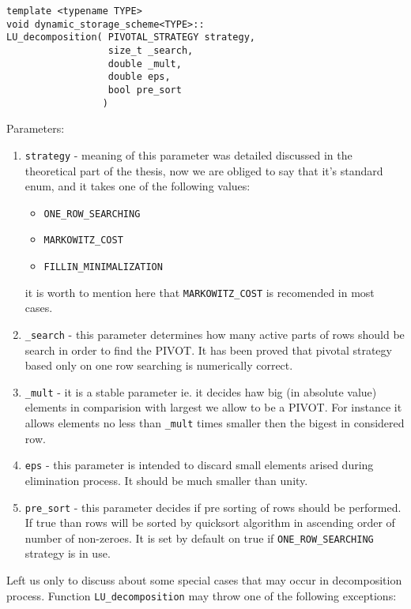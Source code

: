 \begin{verbatim}
template <typename TYPE>
void dynamic_storage_scheme<TYPE>::
LU_decomposition( PIVOTAL_STRATEGY strategy,
                  size_t _search,
                  double _mult,
                  double eps,
                  bool pre_sort
                 )
\end{verbatim}
Parameters:
\begin{enumerate}
	\item \texttt{strategy} - meaning of this parameter was detailed discussed in the theoretical part of the thesis, now we are obliged to say that it's standard enum, and it takes one of the following values:
	\begin{itemize}
		\item \texttt{ONE\_ROW\_SEARCHING}
		\item \texttt{MARKOWITZ\_COST}
    \item \texttt{FILLIN\_MINIMALIZATION}
	\end{itemize}
	it is worth to mention here that \texttt{MARKOWITZ\_COST} is recomended in most cases.
	
	\item \texttt{\_search} - this parameter determines how many active parts of rows should be search in order to find the PIVOT. It has been proved that pivotal strategy based only on one row searching is numerically correct.
	
	\item \texttt{\_mult} - it is a stable parameter ie. it decides haw big (in absolute value) elements in comparision with largest we allow to be a PIVOT. For instance it allows elements no less than \texttt{\_mult} times smaller then the bigest in considered row.
	
	\item \texttt{eps} - this parameter is intended to discard small elements arised during elimination process. It should be much smaller than unity.
	
	\item \texttt{pre\_sort} - this parameter decides if pre sorting of rows should be performed. If true than rows will be sorted by quicksort algorithm in ascending order of number of non-zeroes. It is set by default on true if \texttt{ONE\_ROW\_SEARCHING} strategy is in use.
		
\end{enumerate}

\noindent Left us only to discuss about some special cases that may occur in decomposition process. Function \texttt{LU\_decomposition} may throw one of the following exceptions:

